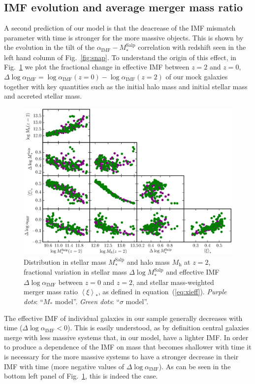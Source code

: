 \documentclass[usenatbib]{mnras}
\def\mhalo{M_{\mathrm{h}}}
\def\msalp{M_*^{\mathrm{Salp}}}
\def\aimf{\alpha_{\mathrm{IMF}}}
\def\Fref#1{Fig.~\ref{#1}\xspace}
\def\Eref#1{equation~(\ref{#1})\xspace}
\begin{document}
\subsection{IMF evolution and average merger mass ratio}

A second prediction of our model is that the deacrease of the IMF
mismatch parameter with time is stronger for the more massive
objects. This is shown by the evolution in the tilt of the
$\aimf-\msalp$ correlation with redshift seen in the left hand column
of \Fref{fig:snap}.  To understand the origin of this effect, in
\Fref{fig:cornerplot} we plot the fractional change in effective IMF
between $z=2$ and $z=0$,
$\Delta\log{\aimf}=\log{\aimf}(z=0)-\log{\aimf}(z=2)$ of our mock
galaxies together with key quantities such as the initial halo mass
and initial stellar mass and accreted stellar mass.
%
\begin{figure}
 \includegraphics[width=\textwidth]{cornerplot.eps}
 \caption{ 
   Distribution in stellar mass $\msalp$ and halo mass $\mhalo$ at $z=2$, fractional
   variation in stellar mass $\Delta\log{\msalp}$ and effective IMF $\Delta\log{\aimf}$ between $z=0$ and $z=2$, and stellar
   mass-weighted merger mass ratio $\left<\xi\right>_*$, as defined in \Eref{eq:xieff}.
   {\em Purple dots}: ``$M_*$ model''. {\em Green dots}: ``$\sigma$
   model''.  }
 \label{fig:cornerplot}
\end{figure}
%
The effective IMF of individual galaxies in our sample generally
decreases with time ($\Delta\log{\aimf}<0$). This is easily
understood, as by definition central galaxies merge with less massive
systems that, in our model, have a lighter IMF.  In order to produce a
dependence of the IMF on mass that becomes shallower with time it is
necessary for the more massive systems to have a stronger decrease in
their IMF with time (more negative values of $\Delta\log{\aimf}$).  As
can be seen in the bottom left panel of \Fref{fig:cornerplot}, this is
indeed the case.
\end{document}
